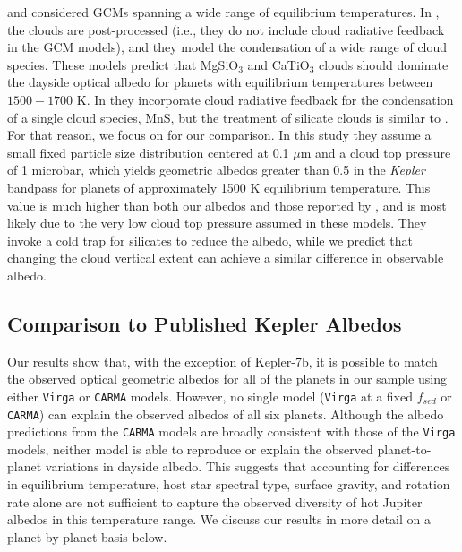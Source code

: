 \documentclass[twocolumn]{aastex63}
\begin{document}
\citet{parmentier2016} and \citet{parmentier2021} considered GCMs spanning a wide range of equilibrium temperatures.  In \cite{parmentier2016}, the clouds are post-processed (i.e., they do not include cloud radiative feedback in the GCM models), and they model the condensation of a wide range of cloud species.  These models predict that MgSiO$_3$ and CaTiO$_3$ clouds should dominate the dayside optical albedo for planets with equilibrium temperatures between $1500-1700$ K.  In \cite{parmentier2021} they incorporate cloud radiative feedback for the condensation of a single cloud species, MnS, but the treatment of silicate clouds is similar to \citet{parmentier2016}.  For that reason, we focus on \cite{parmentier2016} for our comparison.  In this study they assume a small fixed particle size distribution centered at 0.1 $\mu$m and a cloud top pressure of 1 microbar, which yields geometric albedos greater than 0.5 in the \emph{Kepler} bandpass for planets of approximately 1500 K equilibrium temperature. This value is much higher than both our albedos and those reported by \cite{roman2021}, and is most likely due to the very low cloud top pressure assumed in these models. They invoke a cold trap for silicates to reduce the albedo, while we predict that changing the cloud vertical extent can achieve a similar difference in observable albedo.

\subsection{Comparison to Published Kepler Albedos}\label{sec:planets}

Our results show that, with the exception of Kepler-7b, it is possible to match the observed optical geometric albedos for all of the planets in our sample using either \texttt{Virga} or \texttt{CARMA} models. However, no single model (\texttt{Virga} at a fixed $f_{sed}$ or \texttt{CARMA}) can explain the observed albedos of all six planets. Although the albedo predictions from the \texttt{CARMA} models are broadly consistent with those of the \texttt{Virga} models, neither model is able to reproduce or explain the observed planet-to-planet variations in dayside albedo. This suggests that accounting for differences in equilibrium temperature, host star spectral type, surface gravity, and rotation rate alone are not sufficient to capture the observed diversity of hot Jupiter albedos in this temperature range. We discuss our results in more detail on a planet-by-planet basis below. 
\end{document}
